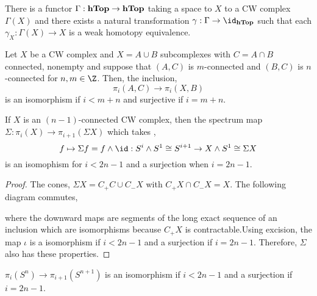 \documentclass[12pt]{extarticle}
\begin{document}
\begin{theorem}
There is a functor $\Gamma : \mathbf{hTop} \to \mathbf{hTop}$ taking a space to $X$ to a CW complex $\Gamma(X)$ and there exists a natural transformation $\gamma : \Gamma \to \id_{\hTop}$ such that each $\gamma_X : \Gamma(X) \to X$ is a weak homotopy equivalence. 
\end{theorem}

\begin{theorem}[Excison]
Let $X$ be a CW complex and $X = A \cup B$ subcomplexes with $C = A \cap B$ connected, nonempty and suppose that $(A, C)$ is $m$-connected and $(B, C)$ is $n$-connected for $n,m \in \Z$. Then, the inclusion,
\[ \pi_i(A, C) \to \pi_i(X, B)\]
is an isomorphism if $i < m + n$ and surjective if $i = m + n$.   
\end{theorem}

\begin{corollary}
If $X$ is an $(n-1)$-connected CW complex, then the spectrum map $\Sigma : \pi_i(X) \to \pi_{i+1}(\Sigma X)$ which takes ,
\[ f \mapsto \Sigma f = f \wedge \id : S^i \wedge S^1 \cong S^{i+1} \to X \wedge S^1 \cong \Sigma X \] 
is an isomophism for $ i < 2 n - 1$ and a surjection when $i = 2 n - 1$. 
\end{corollary}

\begin{proof}
The cones, $\Sigma X = C_+ C \cup C_{-} X$ with $C_+ X \cap C_{-} X = X$. The following diagram commutes,
\begin{center}
\end{center}
where the downward maps are segments of the long exact sequence of an inclusion which are isomorphisms because $C_{+}X$ is contractable.Using excision, the map $\iota$ is a isomorphism if $i < 2 n - 1$ and a surjection if $ i = 2n - 1$. Therefore, $\Sigma$ also has these properties.   
\end{proof}

\begin{corollary}
$\pi_i(S^n) \to \pi_{i + 1}(S^{n+1})$ is an isomorphism if $i < 2n - 1$ and a surjection if $i = 2n - 1$.
\end{corollary}
\end{document}
